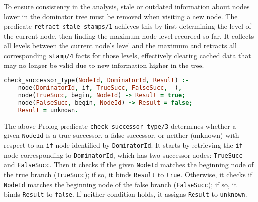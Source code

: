 \smallbreak
To ensure consistency in the analysis, stale or outdated information about nodes lower in the dominator tree must be removed when visiting a new node. The predicate \texttt{retract\_stale\_stamps/1} achieves this by first determining the level of the current node, then finding the maximum node level recorded so far. It collects all levels between the current node’s level and the maximum and retracts all corresponding \texttt{stamp/4} facts for those levels, effectively clearing cached data that may no longer be valid due to new information higher in the tree.

\smallbreak

\begin{lstlisting}[language=Prolog]
% Predicate to check if a node is a true successor or a false successor of a given node
check_successor_type(NodeId, DominatorId, Result) :-
    node(DominatorId, if, TrueSucc, FalseSucc, _),
    node(TrueSucc, begin, NodeId) -> Result = true;
    node(FalseSucc, begin, NodeId) -> Result = false;
    Result = unknown.
\end{lstlisting}

The above Prolog predicate \texttt{check\_successor\_type/3} determines whether a given \texttt{NodeId} is a true successor, a false successor, or neither (unknown) with respect to an \texttt{if} node identified by \texttt{DominatorId}. It starts by retrieving the \texttt{if} node corresponding to \texttt{DominatorId}, which has two successor nodes: \texttt{TrueSucc} and \texttt{FalseSucc}. Then it checks if the given \texttt{NodeId} matches the beginning node of the true branch (\texttt{TrueSucc}); if so, it binds \texttt{Result} to \texttt{true}. Otherwise, it checks if \texttt{NodeId} matches the beginning node of the false branch (\texttt{FalseSucc}); if so, it binds \texttt{Result} to \texttt{false}. If neither condition holds, it assigns \texttt{Result} to \texttt{unknown}.

